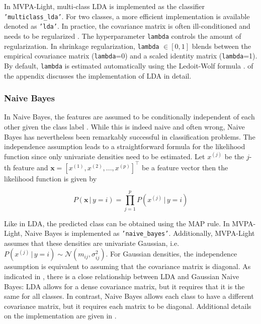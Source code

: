 \documentclass[utf8]{frontiersSCNS} %
\newcommand{\x}{\mathbf{x}}
\newcommand{\xf}[1]{x^{(#1)}} %
\newcommand{\ttt}[1]{\texttt{#1}}
\begin{document}
In MVPA-Light, multi-class LDA is implemented as the classifier  \texttt{'multiclass\_lda'}. For two classes, a more efficient implementation is available denoted as  \ttt{'lda'}. In practice, the covariance matrix is often ill-conditioned and needs to be regularized \citep{Blankertz2011}. The hyperparameter \ttt{lambda} controls the amount of regularization. In shrinkage regularization,  \ttt{lambda} $\in [0,1]$ blends between the empirical covariance matrix (\ttt{lambda}=0) and a scaled identity matrix (\ttt{lambda}=1). By default, \ttt{lambda} is estimated automatically using the Ledoit-Wolf formula \citep{Ledoit2003HoneyMatrix,Blankertz2011}.  of the appendix discusses the implementation of LDA in detail.


\subsubsection{Naive Bayes}

In Naive Bayes, the features are assumed to be conditionally independent of each other given the class label \citep{Bishop2007}. While this is indeed naive and often wrong, Naive Bayes has nevertheless been remarkably successful in classification problems. The independence assumption leads to a straightforward formula for the likelihood function since only univariate densities need to be estimated. Let $\xf{j}$ be the $j$-th feature and $\x = [\xf{1}, \xf{2}, ..., \xf{p}]^\top$ be a feature vector then the likelihood function is given by

\begin{equation*}
P(\x\,|\,y = i) = \prod_{j=1}^p P(\xf{j}\,|\,y = i)
\end{equation*}

Like in LDA, the predicted class can be obtained using the MAP rule. In MVPA-Light, Naive Bayes is implemented as \texttt{'naive\_bayes'}. Additionally, MVPA-Light assumes that these densities are univariate Gaussian, i.e. $P(\xf{j}\,|\,y = i) \sim \mathcal{N}(m_{ij}, \sigma^2_{ij})$. For Gaussian densities, the independence assumption is equivalent to assuming that the covariance matrix is diagonal. As indicated in , there is a close relationship between LDA and Gaussian Naive Bayes: LDA allows for a dense covariance matrix, but it requires that it is the same for all classes. In contrast, Naive Bayes allows each class to have a different covariance matrix, but it requires each matrix to be diagonal. Additional details on the implementation are given in .
\end{document}
